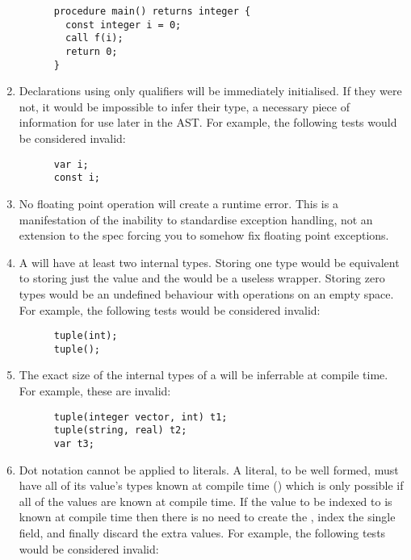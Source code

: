 \documentclass[../gazprea.tex]{subfiles}
\begin{document}
\begin{enumerate}
\begin{lstlisting}
      procedure main() returns integer {
        const integer i = 0;
        call f(i);
        return 0;
      }
    \end{lstlisting}
  \item
    Declarations using only qualifiers will be immediately initialised. If they were not, it would
    be impossible to infer their type, a necessary piece of information for use later in the AST.
    For example, the following tests would be considered invalid:
    \begin{lstlisting}
      var i;
      const i;
    \end{lstlisting}
  \item
    No floating point operation will create a runtime error. This is a manifestation of the
    inability to standardise exception handling, not an extension to the spec forcing you to somehow
    fix floating point exceptions.
  \item
    A  will have at least two internal types. Storing one type would be equivalent to
    storing just the value and the  would be a useless wrapper. Storing zero types would
    be an undefined behaviour with operations on an empty space. For example, the following tests
    would be considered invalid:
    \begin{lstlisting}
      tuple(int);
      tuple();
    \end{lstlisting}
  \item
    The exact size of the internal types of a  will be inferrable at compile time. For
    example, these are invalid:
    \begin{lstlisting}
      tuple(integer vector, int) t1;
      tuple(string, real) t2;
      var t3;
    \end{lstlisting}
  \item
    Dot notation cannot be applied to  literals. A  literal, to be well
    formed, must have all of its value's types known at compile time
    () which is only possible if all of the values are known at
    compile time. If the value to be indexed to is known at compile time then there is no need to
    create the , index the single field, and finally discard the extra values. For
    example, the following tests would be considered invalid:
    \begin{lstlisting}

\end{lstlisting}
\end{enumerate}
\end{document}
